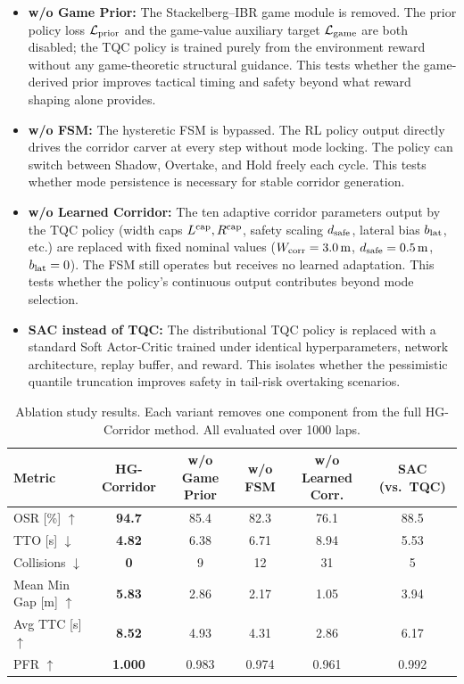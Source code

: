 \begin{itemize}
\item \textbf{w/o Game Prior:} The Stackelberg--IBR game module is
  removed.  The prior policy loss $\mathcal{L}_{\rm prior}$ and the
  game-value auxiliary target $\mathcal{L}_{\rm game}$ are both disabled;
  the TQC policy is trained purely from the environment reward without
  any game-theoretic structural guidance.  This tests whether the
  game-derived prior improves tactical timing and safety beyond what
  reward shaping alone provides.
\item \textbf{w/o FSM:} The hysteretic FSM is bypassed.  The RL policy
  output directly drives the corridor carver at every step without mode
  locking.  The policy can switch between Shadow, Overtake, and Hold
  freely each cycle.  This tests whether mode persistence is necessary
  for stable corridor generation.
\item \textbf{w/o Learned Corridor:} The ten adaptive corridor parameters
  output by the TQC policy (width caps $L^{\rm cap},R^{\rm cap}$, safety
  scaling $d_{\rm safe}$, lateral bias $b_{\rm lat}$, etc.) are replaced
  with fixed nominal values ($W_{\rm corr}=3.0\,\mathrm{m}$,
  $d_{\rm safe}=0.5\,\mathrm{m}$, $b_{\rm lat}=0$).  The FSM still
  operates but receives no learned adaptation.  This tests whether the
  policy's continuous output contributes beyond mode selection.
\item \textbf{SAC instead of TQC:} The distributional TQC policy is
  replaced with a standard Soft Actor-Critic trained under identical
  hyperparameters, network architecture, replay buffer, and reward.  This
  isolates whether the pessimistic quantile truncation improves safety in
  tail-risk overtaking scenarios.
\end{itemize}

\begin{table}[!htbp]
\centering
\scriptsize
\setlength{\tabcolsep}{3pt}
\renewcommand{\arraystretch}{1.15}
\caption{Ablation study results.  Each variant removes one component from
the full HG-Corridor method.  All evaluated over 1000 laps.}
\label{tab:ablation}
\begin{tabular}{@{}lccccc@{}}
\toprule
Metric & HG-Corridor & w/o Game Prior & w/o FSM & w/o Learned Corr. & SAC (vs.\ TQC) \\
\midrule
OSR [\%] $\uparrow$       & \textbf{94.7} & 85.4 & 82.3 & 76.1 & 88.5 \\
TTO [s] $\downarrow$      & \textbf{4.82} & 6.38 & 6.71 & 8.94 & 5.53 \\
Collisions $\downarrow$   & \textbf{0}    & 9    & 12   & 31   & 5 \\
Mean Min Gap [m] $\uparrow$ & \textbf{5.83} & 2.86 & 2.17 & 1.05 & 3.94 \\
Avg TTC [s] $\uparrow$    & \textbf{8.52} & 4.93 & 4.31 & 2.86 & 6.17 \\
PFR $\uparrow$            & \textbf{1.000}& 0.983 & 0.974 & 0.961 & 0.992 \\
\bottomrule
\end{tabular}
\end{table}

